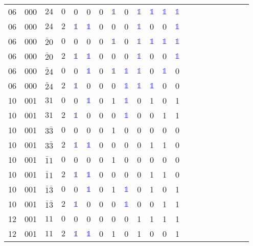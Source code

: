 \begin{longtable*}{c| cccccccccccccccccccc }
06& 000& $24$& $0$& 0& 0& 0& \textcolor{blue}{$\mathds{1}$}& 0& \textcolor{blue}{$\mathds{1}$}& \textcolor{blue}{$\mathds{1}$}& \textcolor{blue}{$\mathds{1}$}& \textcolor{blue}{$\mathds{1}$}\\
06& 000& $24$& $2$& \textcolor{blue}{$\mathds{1}$}& \textcolor{blue}{$\mathds{1}$}& 0& 0& 0& \textcolor{blue}{$\mathds{1}$}& 0& 0& \textcolor{blue}{$\mathds{1}$}\\
06& 000& $\bar{2}0$& $0$& 0& 0& 0& \textcolor{blue}{$\mathds{1}$}& 0& \textcolor{blue}{$\mathds{1}$}& \textcolor{blue}{$\mathds{1}$}& \textcolor{blue}{$\mathds{1}$}& \textcolor{blue}{$\mathds{1}$}\\
06& 000& $\bar{2}0$& $2$& \textcolor{blue}{$\mathds{1}$}& \textcolor{blue}{$\mathds{1}$}& 0& 0& 0& \textcolor{blue}{$\mathds{1}$}& 0& 0& \textcolor{blue}{$\mathds{1}$}\\
06& 000& $\bar{2}4$& $0$& 0& \textcolor{blue}{$\mathds{1}$}& 0& \textcolor{blue}{$\mathds{1}$}& \textcolor{blue}{$\mathds{1}$}& \textcolor{blue}{$\mathds{1}$}& 0& \textcolor{blue}{$\mathds{1}$}& 0\\
06& 000& $\bar{2}4$& $2$& \textcolor{blue}{$\mathds{1}$}& 0& 0& 0& \textcolor{blue}{$\mathds{1}$}& \textcolor{blue}{$\mathds{1}$}& \textcolor{blue}{$\mathds{1}$}& 0& 0\\
10& 001& $31$& $0$& 0& \textcolor{blue}{$\mathds{1}$}& 0& 1& \textcolor{blue}{$\mathds{1}$}& 0& 1& 0& 1\\
10& 001& $31$& $2$& \textcolor{blue}{$\mathds{1}$}& 0& 0& 0& \textcolor{blue}{$\mathds{1}$}& 0& 0& 1& 1\\
10& 001& $3\bar{3}$& $0$& 0& 0& 0& 1& 0& 0& 0& 0& 0\\
10& 001& $3\bar{3}$& $2$& \textcolor{blue}{$\mathds{1}$}& \textcolor{blue}{$\mathds{1}$}& 0& 0& 0& 0& 1& 1& 0\\
10& 001& $\bar{1}1$& $0$& 0& 0& 0& 1& 0& 0& 0& 0& 0\\
10& 001& $\bar{1}1$& $2$& \textcolor{blue}{$\mathds{1}$}& \textcolor{blue}{$\mathds{1}$}& 0& 0& 0& 0& 1& 1& 0\\
10& 001& $\bar{1}\bar{3}$& $0$& 0& \textcolor{blue}{$\mathds{1}$}& 0& 1& \textcolor{blue}{$\mathds{1}$}& 0& 1& 0& 1\\
10& 001& $\bar{1}\bar{3}$& $2$& \textcolor{blue}{$\mathds{1}$}& 0& 0& 0& \textcolor{blue}{$\mathds{1}$}& 0& 0& 1& 1\\
12& 001& $11$& $0$& 0& 0& 0& 0& 0& 1& 1& 1& 1\\
12& 001& $11$& $2$& \textcolor{blue}{$\mathds{1}$}& \textcolor{blue}{$\mathds{1}$}& 0& 1& 0& 1& 0& 0& 1\\

\end{longtable*}
